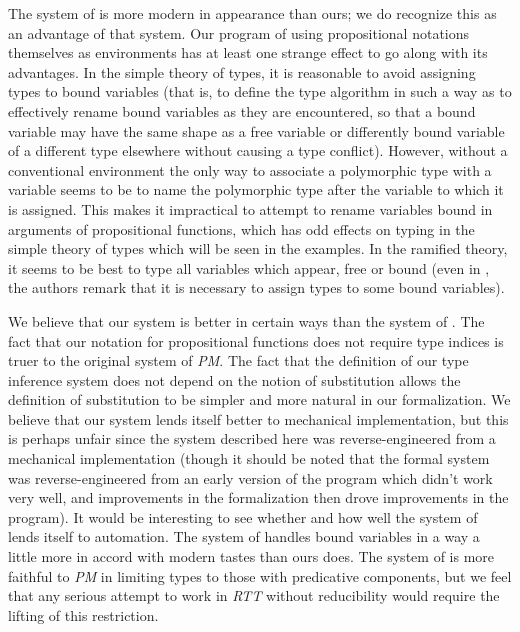 \documentclass{article}
\begin{document}
The system of \cite{types40} is more modern in appearance than ours;
we do recognize this as an advantage of that system.  Our program of
using propositional notations themselves as environments has at least
one strange effect to go along with its advantages.  In the simple
theory of types, it is reasonable to avoid assigning types to bound
variables (that is, to define the type algorithm in such a way as to
effectively rename bound variables as they are encountered, so that a
bound variable may have the same shape as a free variable or
differently bound variable of a different type elsewhere without
causing a type conflict).  However, without a conventional environment
the only way to associate a polymorphic type with a variable seems to
be to name the polymorphic type after the variable to which it is
assigned.  This makes it impractical to attempt to rename variables
bound in arguments of propositional functions, which has odd effects
on typing in the simple theory of types which will be seen in the
examples.  In the ramified theory, it seems to be best to type all
variables which appear, free or bound (even in \cite{types40}, the
authors remark that it is necessary to assign types to some bound
variables).

We believe that our system is better in certain ways than the system
of \cite{types40}.  The fact that our notation for propositional
functions does not require type indices is truer to the original
system of {\em PM\/}.  The fact that the definition of our type
inference system does not depend on the notion of substitution allows
the definition of substitution to be simpler and more natural in our
formalization.  We believe that our system lends itself better to
mechanical implementation, but this is perhaps unfair since the system
described here was reverse-engineered from a mechanical implementation
(though it should be noted that the formal system was
reverse-engineered from an early version of the program which didn't
work very well, and improvements in the formalization then drove
improvements in the program).  It would be interesting to see whether
and how well the system of \cite{types40} lends itself to automation.
The system of \cite{types40} handles bound variables in a way a little
more in accord with modern tastes than ours does.  The system of
\cite{types40} is more faithful to {\em PM\/} in limiting types to
those with predicative components, but we feel that any serious
attempt to work in {\em RTT\/} without reducibility would require the
lifting of this restriction.
\end{document}
